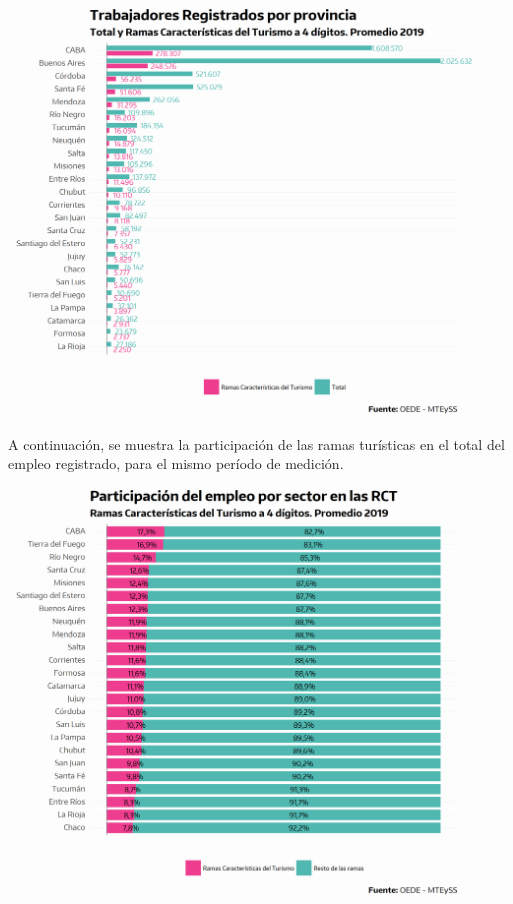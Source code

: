 \documentclass[
  openany]{book}
\begin{document}
\begin{center}\includegraphics[width=1\linewidth]{imagenes/empleo.prov} \end{center}

A continuación, se muestra la participación de las ramas turísticas en el total del empleo registrado, para el mismo período de medición.

\begin{center}\includegraphics[width=1\linewidth]{imagenes/empleo.prov.part} \end{center}
\end{document}
